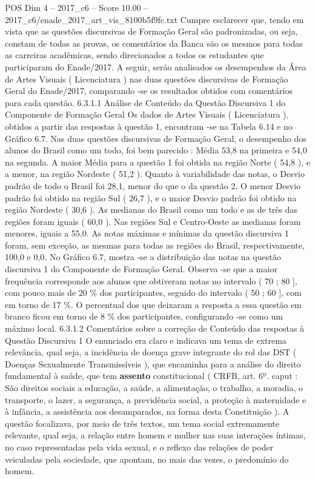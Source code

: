 \begin{textsample}{POS Dim 4 – 2017\_c6 – Score 10.00 – 2017\_c6/enade\_2017\_art\_vis\_8100b5f9fc.txt}
Cumpre esclarecer que, tendo em vista que as questões discursivas de Formação Geral são padronizadas, ou seja, constam de todas as provas, os comentários da Banca são os mesmos para todas as carreiras acadêmicas, sendo direcionados a todos os estudantes que participaram do Enade/2017.
A seguir, serão analisados os desempenhos da Área de Artes Visuais ( Licenciatura ) nas duas questões discursivas de Formação Geral do Enade/2017, comparando -se os resultados obtidos com comentários para cada questão. 6.3.1.1 Análise de Conteúdo da Questão Discursiva 1 do Componente de Formação Geral Os dados de Artes Visuais ( Licenciatura ), obtidos a partir das respostas à questão 1, encontram -se na Tabela 6.14 e no Gráfico 6.7.
Nas duas questões discursivas de Formação Geral, o desempenho dos alunos do Brasil como um todo, foi bem parecido : Média 53,8 na primeira e 54,0 na segunda.
A maior Média para a questão 1 foi obtida na região Norte ( 54,8 ), e a menor, na região Nordeste ( 51,2 ).
Quanto à variabilidade das notas, o Desvio padrão de todo o Brasil foi 28,1, menor do que o da questão 2.
O menor Desvio padrão foi obtido na região Sul ( 26,7 ), e o maior Desvio padrão foi obtido na região Nordeste ( 30,6 ).
As medianas do Brasil como um todo e as de três das regiões foram iguais ( 60,0 ).
Nas regiões Sul e Centro-Oeste as medianas foram menores, iguais a 55,0.
As notas máximas e mínimas da questão discursiva 1 foram, sem exceção, as mesmas para todas as regiões do Brasil, respectivamente, 100,0 e 0,0.
No Gráfico 6.7, mostra -se a distribuição das notas na questão discursiva 1 do Componente de Formação Geral.
Observa -se que a maior frequência corresponde aos alunos que obtiveram notas no intervalo ( 70 ; 80 ], com pouco mais de 20 \% dos participantes, seguido do intervalo ( 50 ; 60 ], com em torno de 17 \%.
O percentual dos que deixaram a resposta a essa questão em branco ficou em torno de 8 \% dos participantes, configurando -se como um máximo local. 6.3.1.2 Comentários sobre a correção de Conteúdo das respostas à Questão Discursiva 1 O enunciado era claro e indicava um tema de extrema relevância, qual seja, a incidência de doença grave integrante do rol das DST ( Doenças Sexualmente Transmissíveis ), que encaminha para a análise do direito fundamental à saúde, que tem \textbf{assento} constitucional ( CRFB, art. 6º. caput : São direitos sociais a educação, a saúde, a alimentação, o trabalho, a moradia, o transporte, o lazer, a segurança, a previdência social, a proteção à maternidade e à infância, a assistência aos desamparados, na forma desta Constituição ).
A questão focalizava, por meio de três textos, um tema social extremamente relevante, qual seja, a relação entre homem e mulher nas suas interações íntimas, no caso representadas pela vida sexual, e o reflexo das relações de poder veiculadas pela sociedade, que apontam, no mais das vezes, o predomínio do homem.

\end{textsample}
